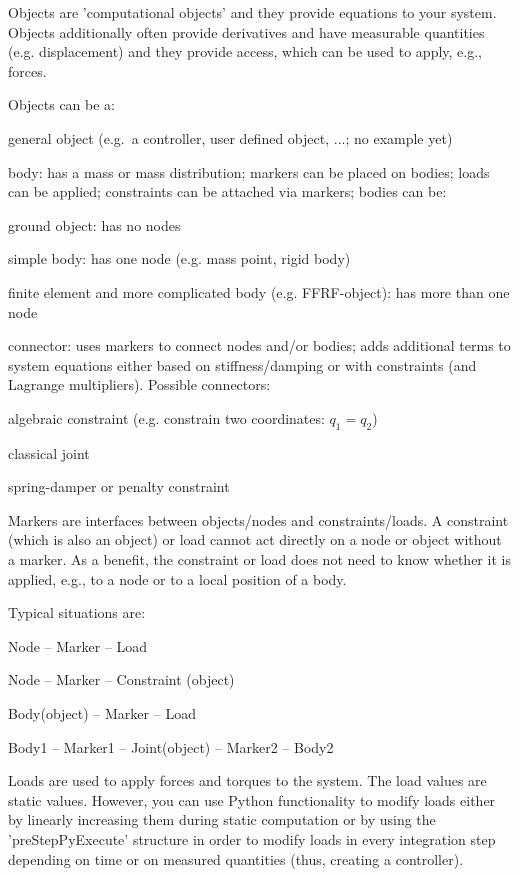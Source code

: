 Objects are 'computational objects' and they provide equations to your system. Objects additionally often provide derivatives and have measurable quantities (e.g. displacement) and they provide access, which can be used to apply, e.g., forces.

Objects can be a:
\bi
  \item general object (e.g.\ a controller, user defined object, ...; no example yet)
	\item body: has a mass or mass distribution; markers can be placed on bodies; loads can be applied; constraints can be attached via markers; bodies can be:
	\bi
	  \item[--] ground object: has no nodes
	  \item[--] simple body: has one node (e.g. mass point, rigid body)
	  \item[--] finite element and more complicated body (e.g. FFRF-object): has more than one node
	\ei
	\item connector: uses markers to connect nodes and/or bodies; adds additional terms to system equations either based on stiffness/damping or with constraints (and Lagrange multipliers). Possible connectors:
	\bi
		\item[--] algebraic constraint (e.g. constrain two coordinates: $q_1 = q_2$)
		\item[--] classical joint
		\item[--] spring-damper or penalty constraint
	\ei
\ei

Markers are interfaces between objects/nodes and constraints/loads.
A constraint (which is also an object) or load cannot act directly on a node or object without a marker.
As a benefit, the constraint or load does not need to know whether it is applied, e.g., to a node or to a local position of a body.

Typical situations are:
\bi
  \item Node -- Marker -- Load
	\item Node -- Marker -- Constraint (object)
	\item Body(object) -- Marker -- Load
	\item Body1 -- Marker1 -- Joint(object) -- Marker2 -- Body2
\ei

Loads are used to apply forces and torques to the system. The load values are static values. However, you can use Python functionality to modify loads either by linearly increasing them during static computation or by using the 'preStepPyExecute' structure in order to modify loads in every integration step depending on time or on measured quantities (thus, creating a controller).

